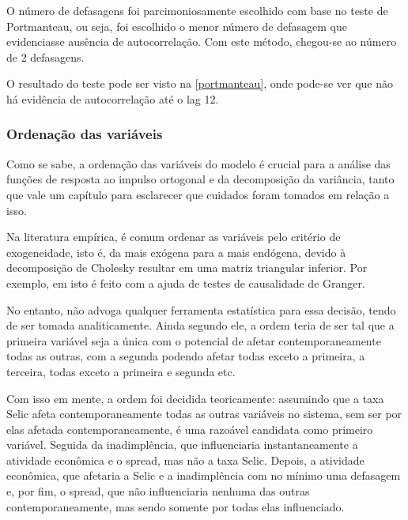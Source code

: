 \documentclass[a4paper,
               article,
               12pt,
               openany,
               oneside,
               english,
               brazil]{abntex2}
\numberwithin{equation}{section}
\begin{document}
    O número de defasagens foi parcimoniosamente escolhido com base no teste de Portmanteau, ou seja, foi escolhido o menor número de defasagem que evidenciasse ausência de autocorrelação. Com este método, chegou-se ao número de 2 defasagens.

    O resultado do teste pode ser visto na \autoref{portmanteau}, onde pode-se ver que não há evidência de autocorrelação até o lag 12.

    \begin{table}[!hbt]
    \end{table}

    \subsubsection{Ordenação das variáveis}

    Como se sabe, a ordenação das variáveis do modelo é crucial para a análise das funções de resposta ao impulso ortogonal e da decomposição da variância, tanto que vale um capítulo para esclarecer que cuidados foram tomados em relação a isso.

    Na literatura empírica, é comum ordenar as variáveis pelo critério de exogeneidade, isto é, da mais exógena para a mais endógena, devido à decomposição de Cholesky resultar em uma matriz triangular inferior. Por exemplo, em \textcite{oreiro} isto é feito com a ajuda de testes de causalidade de Granger.

    No entanto, \textcite[61]{lutkepool} não advoga qualquer ferramenta estatística para essa decisão, tendo de ser tomada analiticamente. Ainda segundo ele, a ordem teria de ser tal que a primeira variável seja a única com o potencial de afetar contemporaneamente todas as outras, com a segunda podendo afetar todas exceto a primeira, a terceira, todas exceto a primeira e segunda etc.

    Com isso em mente, a ordem foi decidida teoricamente: assumindo que a taxa Selic afeta contemporaneamente todas as outras variáveis no sistema, sem ser por elas afetada contemporaneamente, é uma razoável candidata como primeiro variável. Seguida da inadimplência, que influenciaria instantaneamente a atividade econômica e o spread, mas não a taxa Selic. Depois, a atividade econômica, que afetaria a Selic e a inadimplência com no mínimo uma defasagem e, por fim, o spread, que não influenciaria nenhuma das outras contemporaneamente, mas sendo somente por todas elas influenciado.
\end{document}
